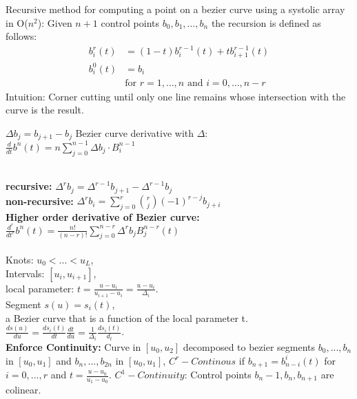 Recursive method for computing a point on a bezier curve using a systolic array in O($n^2$):
Given \( n+1 \) control points \( b_0, b_1, \ldots, b_n \) the recursion is defined as follows:
\begin{align*}
b_i^r(t) &= (1 - t) b_i^{r-1}(t) + t b_{i+1}^{r-1}(t) \\
b_i^0(t) &= b_i \\
&\text{for } r = 1, \ldots, n \text{ and } i = 0, \ldots, n-r
\end{align*}
Intuition: Corner cutting until only one line remains whose intersection with the curve is the result. 

 $\Delta b_j = b_{j+1} - b_j$
Bezier curve derivative with $\Delta$: \\ $\frac{d}{dt}b^n(t) = n\sum_{j=0}^{n-1} \Delta b_j \cdot B_i^{n-1}$


 \\
\textbf{recursive:} $\Delta^r b_j = \Delta^{r-1}b_{j+1} - \Delta^{r-1}b_j$\\
\textbf{non-recursive:} $\Delta^r b_i = \sum_{j=0}^r \binom{r}{j} (-1)^{r-j} b_{j+i}$\\
\textbf{Higher order derivative of Bezier curve:} $\frac{d^r}{dt^r} b^n(t) = \frac{n!}{(n-r)!} \sum_{j=0}^{n-r} \Delta^r b_j B_j^{n-r}(t)$\\
\\
Knots: $u_0 < ... <u_L$, \\
Intervals: $[u_i, u_{i+1}]$, \\
local parameter: $t = \frac{u - u_i}{u_{i+1} - u_i} = \frac{u - u_i}{\Delta_i}$. \\
Segment $s(u) = s_i(t)$, \\
a Bezier curve that is a function of the local parameter t.
$\frac{ds(u)}{du} = \frac{ds_i(t)}{dt}\frac{dt}{du} = \frac{1}{\Delta_i}\frac{ds_i(t)}{d_t}$. \\
\textbf{Enforce Continuity:} Curve in $[u_0, u_2]$ decomposed to bezier segments $b_0, ..., b_n$ in $[u_0, u_1]$ and $b_n, ..., b_{2n}$ in $[u_0, u_1]$, $C^r-Continous$ if $b_{n+1} = b_{n-i}^i(t)$ for $i = 0,...,r$ and $t = \frac{u - u_0}{u_1 - u_0 }$. $C^1-Continuity$: Control points $b_n-1, b_n, b_{n+1}$ are colinear. 

